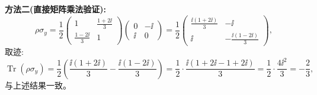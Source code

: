 \begin{solution}
\textbf{方法二(直接矩阵乘法验证):}
\[
\rho\sigma_y = \frac{1}{2}\begin{pmatrix}
1 & \frac{1+2\ii}{3} \\[4pt]
\frac{1-2\ii}{3} & 1
\end{pmatrix}
\begin{pmatrix}
0 & -\ii \\ \ii & 0
\end{pmatrix}
= \frac{1}{2}\begin{pmatrix}
\frac{\ii(1+2\ii)}{3} & -\ii \\[4pt]
\ii & -\frac{\ii(1-2\ii)}{3}
\end{pmatrix},
\]
取迹:
\[
\operatorname{Tr}(\rho\sigma_y) = \frac{1}{2}\left(\frac{\ii(1+2\ii)}{3} - \frac{\ii(1-2\ii)}{3}\right)
= \frac{1}{2}\cdot\frac{\ii(1+2\ii-1+2\ii)}{3}
= \frac{1}{2}\cdot\frac{4\ii^2}{3} = -\frac{2}{3},
\]
与上述结果一致。
\end{solution}

